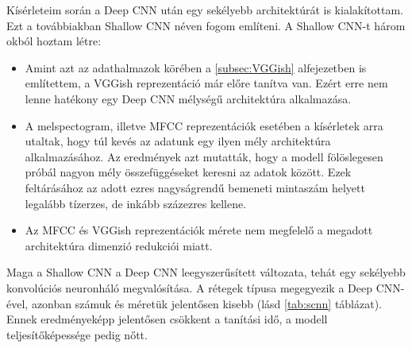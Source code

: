 Kísérleteim során a Deep CNN után egy sekélyebb architektúrát is kialakítottam. Ezt a továbbiakban Shallow CNN néven fogom említeni. A Shallow CNN-t három okból hoztam létre:
 
\begin{itemize}
 \item Amint azt az adathalmazok körében a \ref{subsec:VGGish} alfejezetben is említettem, a VGGish reprezentáció már előre tanítva van. Ezért erre nem lenne hatékony egy Deep CNN mélységű architektúra alkalmazása.
 \item A melspectogram, illetve MFCC reprezentációk esetében a kísérletek arra utaltak, hogy túl kevés az adatunk egy ilyen mély architektúra alkalmazásához. Az eredmények azt mutatták, hogy a modell fölöslegesen próbál nagyon mély összefüggéseket keresni az adatok között. Ezek feltárásához az adott ezres nagyságrendű bemeneti mintaszám helyett legalább tízerzes, de inkább százezres kellene.
 \item Az MFCC és VGGish reprezentációk mérete nem megfelelő a megadott architektúra dimenzió redukciói miatt.
\end{itemize}

Maga a Shallow CNN a Deep CNN leegyszerűsített változata, tehát egy sekélyebb konvolúciós neuronháló megvalósítása. A rétegek típusa megegyezik a Deep CNN-ével, azonban számuk és méretük jelentősen kisebb (lásd \ref{tab:scnn} táblázat). Ennek eredményeképp jelentősen csökkent a tanítási idő, a modell teljesítőképessége pedig nőtt.


